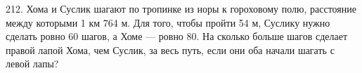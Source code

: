212. Хома и Суслик шагают по тропинке из норы к гороховому полю, расстояние между которыми 1 км 764 м. Для того, чтобы пройти 54 м, Суслику нужно сделать ровно 60 шагов, а Хоме --- ровно 80. На сколько больше шагов сделает правой лапой Хома, чем Суслик, за весь путь, если они оба начали шагать с левой лапы?\\
